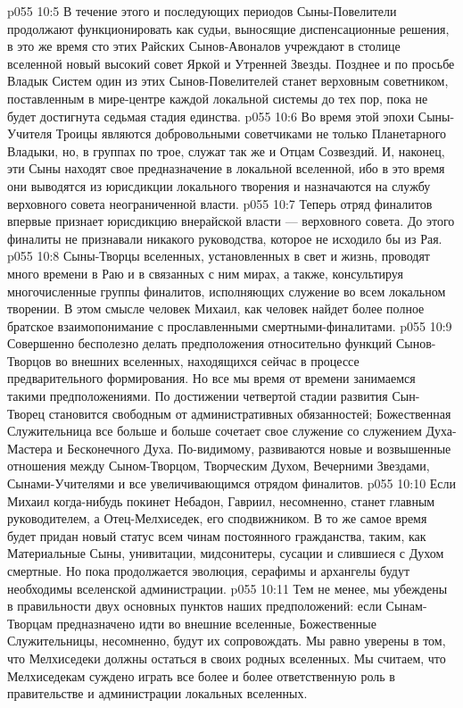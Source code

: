 \vs p055 10:5 В течение этого и последующих периодов Сыны\hyp{}Повелители продолжают функционировать как судьи, выносящие диспенсационные решения, в это же время сто этих Райских Сынов\hyp{}Авоналов учреждают в столице вселенной новый высокий совет Яркой и Утренней Звезды. Позднее и по просьбе Владык Систем один из этих Сынов\hyp{}Повелителей станет верховным советником, поставленным в мире\hyp{}центре каждой локальной системы до тех пор, пока не будет достигнута седьмая стадия единства.
\vs p055 10:6 Во время этой эпохи Сыны\hyp{}Учителя Троицы являются добровольными советчиками не только Планетарного Владыки, но, в группах по трое, служат так же и Отцам Созвездий. И, наконец, эти Сыны находят свое предназначение в локальной вселенной, ибо в это время они выводятся из юрисдикции локального творения и назначаются на службу верховного совета неограниченной власти.
\vs p055 10:7 \pc Теперь отряд финалитов впервые признает юрисдикцию внерайской власти --- верховного совета. До этого финалиты не признавали никакого руководства, которое не исходило бы из Рая.
\vs p055 10:8 Сыны\hyp{}Творцы вселенных, установленных в свет и жизнь, проводят много времени в Раю и в связанных с ним мирах, а также, консультируя многочисленные группы финалитов, исполняющих служение во всем локальном творении. В этом смысле человек Михаил, как человек найдет более полное братское взаимопонимание с прославленными смертными\hyp{}финалитами.
\vs p055 10:9 \pc Совершенно бесполезно делать предположения относительно функций Сынов\hyp{}Творцов во внешних вселенных, находящихся сейчас в процессе предварительного формирования. Но все мы время от времени занимаемся такими предположениями. По достижении четвертой стадии развития Сын\hyp{}Творец становится свободным от административных обязанностей; Божественная Служительница все больше и больше сочетает свое служение со служением Духа\hyp{}Мастера и Бесконечного Духа. По\hyp{}видимому, развиваются новые и возвышенные отношения между Сыном\hyp{}Творцом, Творческим Духом, Вечерними Звездами, Сынами\hyp{}Учителями и все увеличивающимся отрядом финалитов.
\vs p055 10:10 Если Михаил когда\hyp{}нибудь покинет Небадон, Гавриил, несомненно, станет главным руководителем, а Отец\hyp{}Мелхиседек, его сподвижником. В то же самое время будет придан новый статус всем чинам постоянного гражданства, таким, как Материальные Сыны, унивитации, мидсонитеры, сусации и слившиеся с Духом смертные. Но пока продолжается эволюция, серафимы и архангелы будут необходимы вселенской администрации.
\vs p055 10:11 Тем не менее, мы убеждены в правильности двух основных пунктов наших предположений: если Сынам\hyp{}Творцам предназначено идти во внешние вселенные, Божественные Служительницы, несомненно, будут их сопровождать. Мы равно уверены в том, что Мелхиседеки должны остаться в своих родных вселенных. Мы считаем, что Мелхиседекам суждено играть все более и более ответственную роль в правительстве и администрации локальных вселенных.
